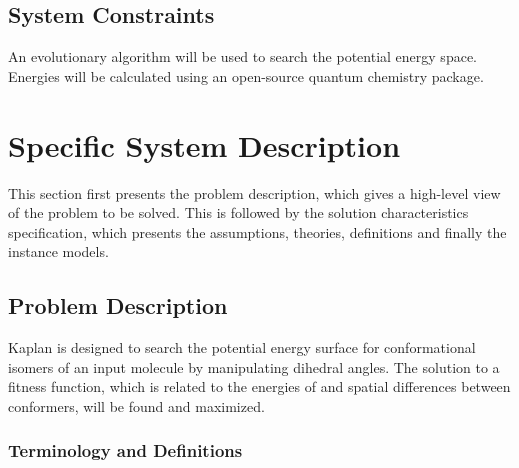 \documentclass[12pt]{article}
\newcommand{\progname}{Kaplan} %
\begin{document}

\subsection{System Constraints}

An evolutionary algorithm will be used to search the potential energy space. 
Energies will be calculated using an open-source quantum chemistry package.

\section{Specific System Description}

This section first presents the problem description, which gives a high-level
view of the problem to be solved.  This is followed by the solution 
characteristics
specification, which presents the assumptions, theories, definitions and finally
the instance models.  

\subsection{Problem Description} \label{Sec_pd}


\progname{} is designed to search the potential energy surface for 
conformational isomers of an input molecule by manipulating dihedral angles. 
The solution to a fitness function, which is related to the energies of and 
spatial differences between conformers, will be found and maximized.

\subsubsection{Terminology and Definitions}

  
\end{document}
